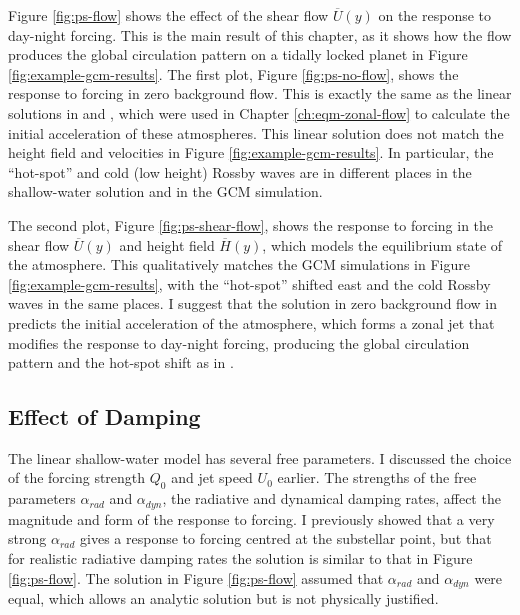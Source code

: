 Figure \ref{fig:ps-flow} shows the effect of the shear flow $\overline{U}(y)$ on the response to day-night forcing. This is the main result of this chapter, as it shows how the flow produces the global circulation pattern on a tidally locked planet in Figure \ref{fig:example-gcm-results}. The first plot, Figure \ref{fig:ps-no-flow}, shows the response to forcing in zero background flow. This is exactly the same as the linear solutions in \citet{matsuno1966quasi} and \citet{showman2011superrotation}, which were used in Chapter \ref{ch:eqm-zonal-flow} to calculate the initial acceleration of these atmospheres. This linear solution does not match the height field and velocities in Figure \ref{fig:example-gcm-results}. In particular, the ``hot-spot'' and cold (low height) Rossby waves are in different places in the shallow-water solution and in the GCM simulation.

The second plot, Figure \ref{fig:ps-shear-flow}, shows the response to forcing in the shear flow $\overline{U}(y)$ and height field $\overline{H}(y)$, which models the equilibrium state of the atmosphere. This qualitatively matches the GCM simulations in Figure \ref{fig:example-gcm-results}, with the ``hot-spot'' shifted east and the cold Rossby waves in the same places. I suggest that the solution in zero background flow in \citet{showman2011superrotation} predicts the initial acceleration of the atmosphere, which forms a zonal jet that modifies the response to day-night forcing, producing the global circulation pattern and the hot-spot shift as in \citet{tsai2014three}.






\subsection{Effect of Damping}\label{sec:effect-damping-rate}

The linear shallow-water model has several free parameters. I discussed the choice of the forcing strength $Q_{0}$ and jet speed $U_{0}$ earlier. The strengths of the free parameters $\alpha_{rad}$ and $\alpha_{dyn}$, the radiative and dynamical damping rates, affect the magnitude and form of the response to forcing. I previously showed that a very strong $\alpha_{rad}$ gives a response to forcing centred at the substellar point, but that for realistic radiative damping rates \citep{showman2011superrotation} the solution is similar to that in Figure \ref{fig:ps-flow}. The solution in Figure \ref{fig:ps-flow} assumed that $\alpha_{rad}$ and $\alpha_{dyn}$ were equal, which allows an analytic solution but is not physically justified.

